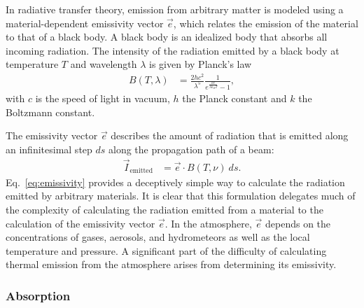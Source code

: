 In radiative transfer theory, emission from arbitrary matter is modeled using a
material-dependent emissivity vector $\vec{e}$, which relates the emission of
the material to that of a black body. A black body is an idealized body that
absorbs all incoming radiation. The intensity of the radiation emitted by a
black body at temperature $T$ and wavelength $\lambda$ is given by Planck's law
\begin{align}
B(T, \lambda) &= \frac{2 h c^2}{\lambda ^ 5}\frac{1}{e^{\frac{hc}{\lambda k_B T}} - 1},
\end{align} with $c$ is the speed of light in vacuum, $h$ the Planck
constant and $k$ the Boltzmann constant.

The emissivity vector $\vec{e}$ describes the amount of radiation that is
emitted along an infinitesimal step $ds$ along the propagation path of a beam: 
 \begin{align}
   \label{eq:emissivity}
   \vec{I}_\text{emitted} &= \vec{e} \cdot B(T, \nu)\ ds.
 \end{align}
 Eq.~\ref{eq:emissivity} provides a deceptively simple way to calculate the
 radiation emitted by arbitrary materials. It is clear that this formulation
 delegates much of the complexity of calculating the radiation emitted from a
 material to the calculation of the emissivity vector $\vec{e}$. In the
 atmosphere, $\vec{e}$ depends on the concentrations of gases, aerosols, and
 hydrometeors as well as the local temperature and pressure. A significant part
 of the difficulty of calculating thermal emission from the atmosphere arises
 from determining its emissivity.




\subsubsection{Absorption}

